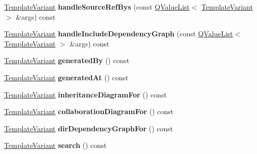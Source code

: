 \begin{DoxyCompactItemize}
\mbox{\hyperlink{class_template_variant}{Template\+Variant}} {\bfseries handle\+Source\+Ref\+Bys} (const \mbox{\hyperlink{class_q_value_list}{Q\+Value\+List}}$<$ \mbox{\hyperlink{class_template_variant}{Template\+Variant}} $>$ \&args) const
\item 
\mbox{\label{class_translate_context_1_1_private_a9dc60f5cca4e1e297a444816dfd09b63}} 
\mbox{\hyperlink{class_template_variant}{Template\+Variant}} {\bfseries handle\+Include\+Dependency\+Graph} (const \mbox{\hyperlink{class_q_value_list}{Q\+Value\+List}}$<$ \mbox{\hyperlink{class_template_variant}{Template\+Variant}} $>$ \&args) const
\item 
\mbox{\label{class_translate_context_1_1_private_aa6840227a969fae5a7f167447a8d6318}} 
\mbox{\hyperlink{class_template_variant}{Template\+Variant}} {\bfseries generated\+By} () const
\item 
\mbox{\label{class_translate_context_1_1_private_a3256a589b27d906a37909b7ac6a90b41}} 
\mbox{\hyperlink{class_template_variant}{Template\+Variant}} {\bfseries generated\+At} () const
\item 
\mbox{\label{class_translate_context_1_1_private_ae344b77c6a60037e718d9497cdfd2ec4}} 
\mbox{\hyperlink{class_template_variant}{Template\+Variant}} {\bfseries inheritance\+Diagram\+For} () const
\item 
\mbox{\label{class_translate_context_1_1_private_a7dfe811d16d77a09e32fdbb1e1389f40}} 
\mbox{\hyperlink{class_template_variant}{Template\+Variant}} {\bfseries collaboration\+Diagram\+For} () const
\item 
\mbox{\label{class_translate_context_1_1_private_a888c6ae5ecda92013eca8d1a400becec}} 
\mbox{\hyperlink{class_template_variant}{Template\+Variant}} {\bfseries dir\+Dependency\+Graph\+For} () const
\item 
\mbox{\label{class_translate_context_1_1_private_a236dd2c1ebe64d2ebb7ff29eeb722724}} 
\mbox{\hyperlink{class_template_variant}{Template\+Variant}} {\bfseries search} () const

\end{DoxyCompactItemize}
